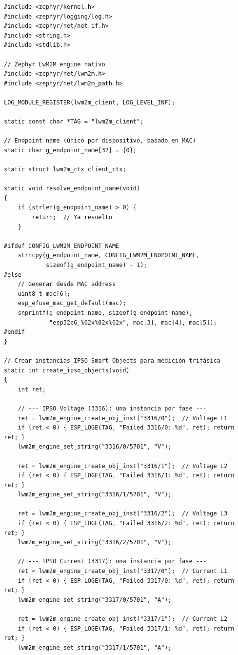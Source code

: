 \begin{verbatim}
#include <zephyr/kernel.h>
#include <zephyr/logging/log.h>
#include <zephyr/net/net_if.h>
#include <string.h>
#include <stdlib.h>

// Zephyr LwM2M engine nativo
#include <zephyr/net/lwm2m.h>
#include <zephyr/net/lwm2m_path.h>

LOG_MODULE_REGISTER(lwm2m_client, LOG_LEVEL_INF);

static const char *TAG = "lwm2m_client";

// Endpoint name (único por dispositivo, basado en MAC)
static char g_endpoint_name[32] = {0};

static struct lwm2m_ctx client_ctx;

static void resolve_endpoint_name(void)
{
    if (strlen(g_endpoint_name) > 0) {
        return;  // Ya resuelto
    }

#ifdef CONFIG_LWM2M_ENDPOINT_NAME
    strncpy(g_endpoint_name, CONFIG_LWM2M_ENDPOINT_NAME,
            sizeof(g_endpoint_name) - 1);
#else
    // Generar desde MAC address
    uint8_t mac[6];
    esp_efuse_mac_get_default(mac);
    snprintf(g_endpoint_name, sizeof(g_endpoint_name),
             "esp32c6_%02x%02x%02x", mac[3], mac[4], mac[5]);
#endif
}

// Crear instancias IPSO Smart Objects para medición trifásica
static int create_ipso_objects(void)
{
    int ret;

    // --- IPSO Voltage (3316): una instancia por fase ---
    ret = lwm2m_engine_create_obj_inst("3316/0");  // Voltage L1
    if (ret < 0) { ESP_LOGE(TAG, "Failed 3316/0: %d", ret); return ret; }
    lwm2m_engine_set_string("3316/0/5701", "V");

    ret = lwm2m_engine_create_obj_inst("3316/1");  // Voltage L2
    if (ret < 0) { ESP_LOGE(TAG, "Failed 3316/1: %d", ret); return ret; }
    lwm2m_engine_set_string("3316/1/5701", "V");

    ret = lwm2m_engine_create_obj_inst("3316/2");  // Voltage L3
    if (ret < 0) { ESP_LOGE(TAG, "Failed 3316/2: %d", ret); return ret; }
    lwm2m_engine_set_string("3316/2/5701", "V");

    // --- IPSO Current (3317): una instancia por fase ---
    ret = lwm2m_engine_create_obj_inst("3317/0");  // Current L1
    if (ret < 0) { ESP_LOGE(TAG, "Failed 3317/0: %d", ret); return ret; }
    lwm2m_engine_set_string("3317/0/5701", "A");

    ret = lwm2m_engine_create_obj_inst("3317/1");  // Current L2
    if (ret < 0) { ESP_LOGE(TAG, "Failed 3317/1: %d", ret); return ret; }
    lwm2m_engine_set_string("3317/1/5701", "A");


\end{verbatim}
